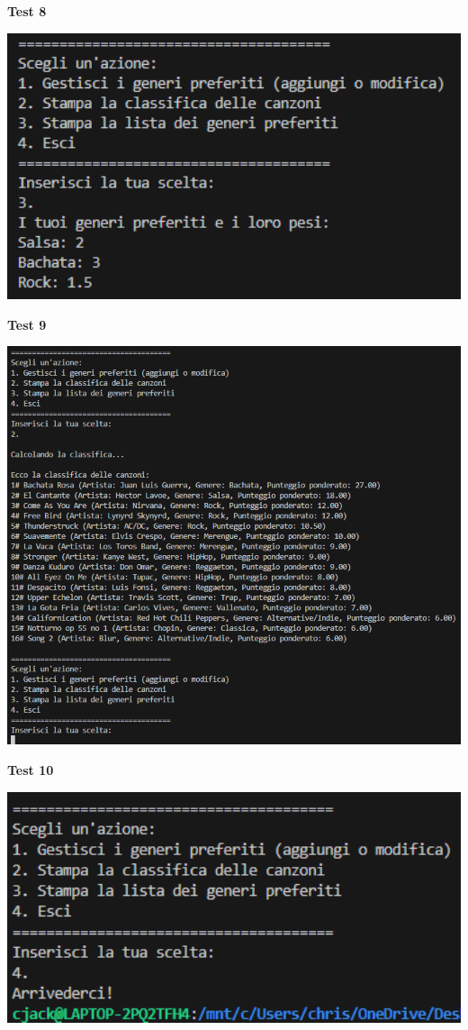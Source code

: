 \documentclass[a4paper,11pt]{article}
\begin{document}
\newpage
\begin{center}
    \textbf{Test 8}
    \par
    \vspace{0.5cm}
    \includegraphics[width=1\textwidth]{ptest8}
\end{center}
\begin{center}
    \textbf{Test 9}
    \par
    \vspace{0.5cm}
    \includegraphics[width=1\textwidth]{ptest9}
\end{center}
\begin{center}
    \textbf{Test 10}
    \par
    \vspace{0.5cm}
    \includegraphics[width=1\textwidth]{ptest10}
\end{center}
\vspace{1cm}
\end{document}
